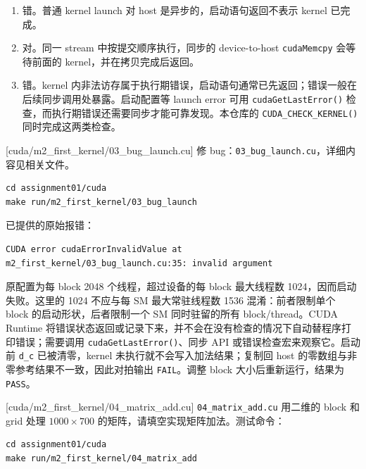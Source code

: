 \documentclass[11pt,a4paper,fontset=none]{ctexart}
\begin{document}
\begin{tcolorbox}[title={2.4 作答（讨论后整理）}]
\begin{enumerate}[label=(\alph*)]
  \item 错。普通 kernel launch 对 host 是异步的，启动语句返回不表示 kernel 已完成。
  \item 对。同一 stream 中按提交顺序执行，同步的 device-to-host \texttt{cudaMemcpy} 会等待前面的 kernel，并在拷贝完成后返回。
  \item 错。kernel 内非法访存属于执行期错误，启动语句通常已先返回；错误一般在后续同步调用处暴露。启动配置等 launch error 可用 \texttt{cudaGetLastError()} 检查，而执行期错误还需要同步才能可靠发现。本仓库的 \texttt{CUDA\_CHECK\_KERNEL()} 同时完成这两类检查。
\end{enumerate}
\end{tcolorbox}

[cuda/m2\_first\_kernel/03\_bug\_launch.cu]
修 bug：\texttt{03\_bug\_launch.cu}，详细内容见相关文件。

\begin{lstlisting}
cd assignment01/cuda
make run/m2_first_kernel/03_bug_launch
\end{lstlisting}

\begin{tcolorbox}[title={2.5 调试记录},breakable]
已提供的原始报错：
\begin{lstlisting}
CUDA error cudaErrorInvalidValue at
m2_first_kernel/03_bug_launch.cu:35: invalid argument
\end{lstlisting}
原配置为每 block 2048 个线程，超过设备的每 block 最大线程数 1024，因而启动失败。这里的 1024 不应与每 SM 最大常驻线程数 1536 混淆：前者限制单个 block 的启动形状，后者限制一个 SM 同时驻留的所有 block/thread。CUDA Runtime 将错误状态返回或记录下来，并不会在没有检查的情况下自动替程序打印错误；需要调用 \texttt{cudaGetLastError()}、同步 API 或错误检查宏来观察它。启动前 \texttt{d\_c} 已被清零，kernel 未执行就不会写入加法结果；复制回 host 的零数组与非零参考结果不一致，因此对拍输出 \texttt{FAIL}。调整 block 大小后重新运行，结果为 \texttt{PASS}。
\end{tcolorbox}

[cuda/m2\_first\_kernel/04\_matrix\_add.cu]
\texttt{04\_matrix\_add.cu} 用二维的 block 和 grid 处理 $1000 \times 700$ 的矩阵，请填空实现矩阵加法。测试命令：

\begin{lstlisting}
cd assignment01/cuda
make run/m2_first_kernel/04_matrix_add
\end{lstlisting}
\end{document}

